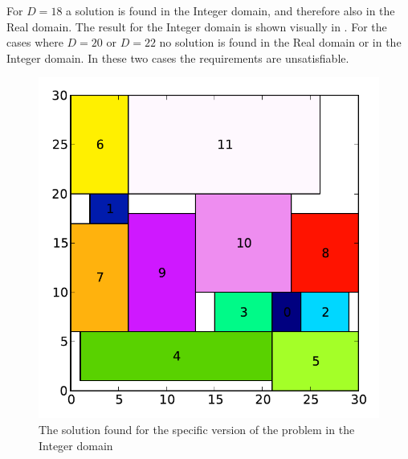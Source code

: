 For $D=18$ a solution is found in the Integer domain, and therefore also in the Real domain. The result for the Integer domain is shown visually in . For the cases where $D = 20$ or $D = 22$ no solution is found in the Real domain or in the Integer domain. In these two cases the requirements are unsatisfiable.
\begin{figure}[!ht]
  \centering
  \includegraphics[width=\columnwidth]{2/out.pdf}
  \caption{The solution found for the specific version of the problem in the Integer domain}
  \label{fig:2_result}
\end{figure}

